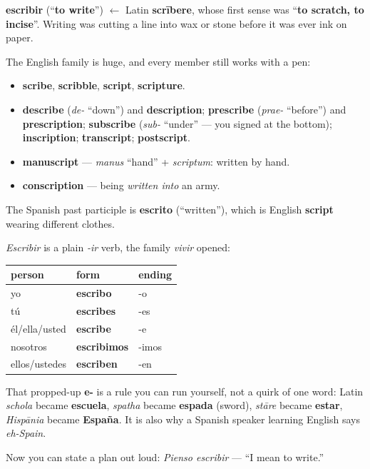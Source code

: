 \begin{cousinweb}
\textbf{escribir} (\textquotedblleft{}\textbf{to write}\textquotedblright{}) $\leftarrow$ Latin \textbf{scrībere}, whose first sense was \textquotedblleft{}\textbf{to scratch, to incise}\textquotedblright{}. Writing was cutting a line into wax or stone before it was ever ink on paper.

The English family is huge, and every member still works with a pen:

\begin{itemize}
\raggedright
  \item \textbf{scribe}, \textbf{scribble}, \textbf{script}, \textbf{scripture}.
  \item \textbf{describe} (\emph{de-} \textquotedblleft{}down\textquotedblright{}) and \textbf{description}; \textbf{prescribe} (\emph{prae-} \textquotedblleft{}before\textquotedblright{}) and \textbf{prescription}; \textbf{subscribe} (\emph{sub-} \textquotedblleft{}under\textquotedblright{} — you signed at the bottom); \textbf{inscription}; \textbf{transcript}; \textbf{postscript}.
  \item \textbf{manuscript} — \emph{manus} \textquotedblleft{}hand\textquotedblright{} + \emph{scriptum}: written by hand.
  \item \textbf{conscription} — being \emph{written into} an army.
\end{itemize}

The Spanish past participle is \textbf{escrito} (\textquotedblleft{}written\textquotedblright{}), which is English \textbf{script} wearing different clothes.
\end{cousinweb}

\begin{grammarlens}[title={Grammar Lens: an -ir verb, and a productive spelling rule}]
\emph{Escribir} is a plain \emph{-ir} verb, the family \emph{vivir} opened:

\noindent
\begin{tabularx}{\linewidth}{@{}>{\raggedright\arraybackslash}X>{\raggedright\arraybackslash}X>{\raggedright\arraybackslash}X@{}}
\toprule
\textbf{person} & \textbf{form} & \textbf{ending} \\
\midrule
yo & \textbf{escribo} & -o \\
tú & \textbf{escribes} & -es \\
él/ella/usted & \textbf{escribe} & -e \\
nosotros & \textbf{escribimos} & -imos \\
ellos/ustedes & \textbf{escriben} & -en \\
\bottomrule
\end{tabularx}

That propped-up \textbf{e-} is a rule you can run yourself, not a quirk of one word: Latin \emph{schola} became \textbf{escuela}, \emph{spatha} became \textbf{espada} (sword), \emph{stāre} became \textbf{estar}, \emph{Hispānia} became \textbf{España}. It is also why a Spanish speaker learning English says \emph{eh-Spain}.

Now you can state a plan out loud: \emph{Pienso escribir} — \textquotedblleft{}I mean to write.\textquotedblright{}
\end{grammarlens}

